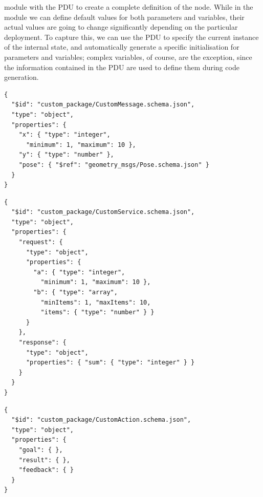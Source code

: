 module with the PDU to create a complete definition of the node. While in the module we can define default values for both parameters and variables, their actual values are going to change significantly depending on the particular deployment. To capture this, we can use the PDU to specify the current instance of the internal state, and automatically generate a specific initialisation for parameters and variables; complex variables, of course, are the exception, since the information contained in the PDU are used to define them during code generation.

\begin{lstlisting}[float,frame=tb,caption={ROS message definition using JSON schema},label=lst:json-ros-msg]
{
  "$id": "custom_package/CustomMessage.schema.json",
  "type": "object",
  "properties": {
    "x": { "type": "integer",
      "minimum": 1, "maximum": 10 },
    "y": { "type": "number" },
    "pose": { "$ref": "geometry_msgs/Pose.schema.json" }
  }
}
\end{lstlisting}

\begin{lstlisting}[float,frame=tb,caption={ROS service definition using JSON schema},label=lst:json-ros-srv]
{
  "$id": "custom_package/CustomService.schema.json",
  "type": "object",
  "properties": {
    "request": {
      "type": "object",
      "properties": {
        "a": { "type": "integer",
          "minimum": 1, "maximum": 10 },
        "b": { "type": "array",
          "minItems": 1, "maxItems": 10,
          "items": { "type": "number" } }
      }
    },
    "response": {
      "type": "object",
      "properties": { "sum": { "type": "integer" } }
    }
  }
}
\end{lstlisting}

\begin{lstlisting}[float,frame=tb,caption={ROS action definition using JSON schema},label=lst:json-ros-act]
{
  "$id": "custom_package/CustomAction.schema.json",
  "type": "object",
  "properties": {
    "goal": { },
    "result": { },
    "feedback": { }
  }
}
\end{lstlisting}
 
